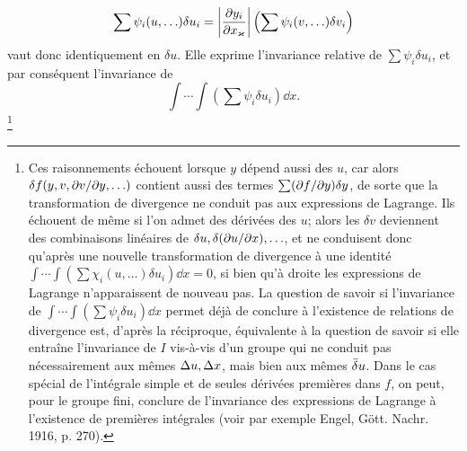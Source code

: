 \[
\sum\psi_i(u,\ldots)\delta u_i
=
\left|\frac{\partial y_i}{\partial x_\varkappa}\right|
\left(\sum\psi_i(v,\ldots)\delta v_i\right)
\]
vaut donc identiquement en \(\delta u\). Elle exprime l'invariance relative de \(\sum\psi_i\delta u_i\), et par conséquent l'invariance de
\[
\int\!\cdots\!\int\left(\sum\psi_i\delta u_i\right)\dd x.
\]
\footnote{Ces raisonnements échouent lorsque \(y\) dépend aussi des \(u\), car alors \(\delta f(y,v,\partial v/\partial y,\ldots)\) contient aussi des termes \(\sum(\partial f/\partial y)\delta y\), de sorte que la transformation de divergence ne conduit pas aux expressions de Lagrange. Ils échouent de même si l'on admet des dérivées des \(u\); alors les \(\delta v\) deviennent des combinaisons linéaires de \(\delta u,\delta(\partial u/\partial x),\ldots\), et ne conduisent donc qu'après une nouvelle transformation de divergence à une identité \(\int\!\cdots\!\int(\sum\chi_i(u,\ldots)\delta u_i)\dd x=0\), si bien qu'à droite les expressions de Lagrange n'apparaissent de nouveau pas. La question de savoir si l'invariance de \(\int\!\cdots\!\int(\sum\psi_i\delta u_i)\dd x\) permet déjà de conclure à l'existence de relations de divergence est, d'après la réciproque, équivalente à la question de savoir si elle entraîne l'invariance de \(I\) vis-à-vis d'un groupe qui ne conduit pas nécessairement aux mêmes \(\Delta u,\Delta x\), mais bien aux mêmes \(\bar{\delta} u\). Dans le cas spécial de l'intégrale simple et de seules dérivées premières dans \(f\), on peut, pour le groupe fini, conclure de l'invariance des expressions de Lagrange à l'existence de premières intégrales (voir par exemple Engel, Gött. Nachr. 1916, p. 270).}

